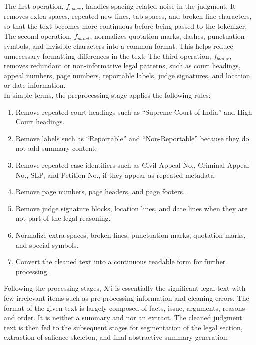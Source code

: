 \documentclass[11pt, a4paper]{article}
\theoremstyle{plain}%
\theoremstyle{remark}%
\theoremstyle{definition}%
\begin{document}
The first operation, \(f_{space}\), handles spacing-related noise in the judgment. It removes extra spaces, repeated new lines, tab spaces, and broken line characters, so that the text becomes more continuous before being passed to the tokenizer. The second operation, \(f_{punct}\), normalizes quotation marks, dashes, punctuation symbols, and invisible characters into a common format. This helps reduce unnecessary formatting differences in the text. The third operation, \(f_{boiler}\), removes redundant or non-informative legal patterns, such as court headings, appeal numbers, page numbers, reportable labels, judge signatures, and location or date information.
\\
In simple terms, the preprocessing stage applies the following rules:
\begin{enumerate}
\item Remove repeated court headings such as ``Supreme Court of India'' and High Court headings.
\item Remove labels such as ``Reportable'' and ``Non-Reportable'' because they do not add summary content.

\item Remove repeated case identifiers such as Civil Appeal No., Criminal Appeal No., SLP, and Petition No., if they appear as repeated metadata.

\item Remove page numbers, page headers, and page footers.

\item Remove judge signature blocks, location lines, and date lines when they are not part of the legal reasoning.

\item Normalize extra spaces, broken lines, punctuation marks, quotation marks, and special symbols.

\item Convert the cleaned text into a continuous readable form for further processing.

\end{enumerate}

Following the processing stages, X'i is essentially the significant legal text with few irrelevant items such as pre-processing information and cleaning errors. The format of the given text is largely composed of facts, issue, arguments, reasons and order. It is neither a summary and nor an extract. The cleaned judgment text is then fed to the subsequent stages for segmentation of the legal section, extraction of salience skeleton, and final abstractive summary generation.
\end{document}
